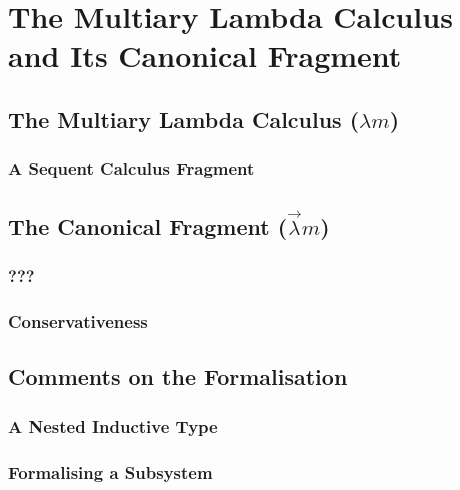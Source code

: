 \chapter{The Multiary Lambda Calculus and Its Canonical Fragment }
\label{c:multiary}

\section{The Multiary Lambda Calculus ($\lambda m$)}

\subsection{A Sequent Calculus Fragment}

\section{The Canonical Fragment ($\vec \lambda m$)}

\subsection{???}

\subsection{Conservativeness}

\section{Comments on the Formalisation}
\subsection{A Nested Inductive Type}
\subsection{Formalising a Subsystem}
